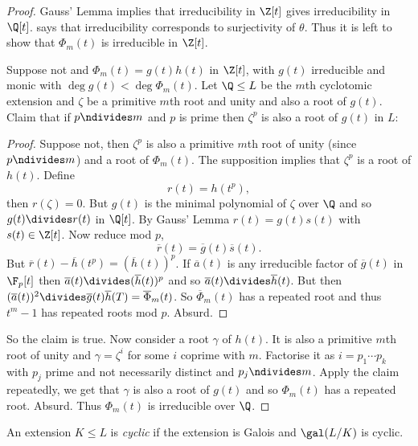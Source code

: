 \documentclass[a4paper]{article}
\newcommand*{\red}[1]{\overline{#1}}
\begin{document}
\begin{proof}
  Gauss' Lemma implies that irreducibility in \(\Z[t]\) gives irreducibility in \(\Q[t]\).  says that irreducibility corresponds to surjectivity of \(\theta\). Thus it is left to show that \(\Phi_m(t)\) is irreducible in \(\Z[t]\).

  Suppose not and \(\Phi_m(t) = g(t)h(t)\) in \(\Z[t]\), with \(g(t)\) irreducible and monic with \(\deg g(t) < \deg \Phi_m(t)\). Let \(\Q \leq L\) be the \(m\)th cyclotomic extension and \(\zeta\) be a primitive \(m\)th root and unity and also a root of \(g(t)\). Claim that if \(p \ndivides m\) and \(p\) is prime then \(\zeta^p\) is also a root of \(g(t)\) in \(L\):

  \begin{proof}
    Suppose not, then \(\zeta^p\) is also a primitive \(m\)th root of unity (since \(p \ndivides m\)) and a root of \(\Phi_m(t)\). The supposition implies that \(\zeta^p\) is a root of \(h(t)\). Define
    \[
      r(t) = h(t^p),
    \]
    then \(r(\zeta) = 0\). But \(g(t)\) is the minimal polynomial of \(\zeta\) over \(\Q\) and so \(g(t) \divides r(t)\) in \(\Q[t]\). By Gauss' Lemma \(r(t) = g(t)s(t)\) with \(s(t) \in \Z[t]\). Now reduce mod \(p\),
    \[
      \red r(t) = \red g(t) \red s(t).
    \]
    But \(\red r(t) - \red h(t^p) = (\red h(t))^p\). If \(\red a(t)\) is any irreducible factor of \(\red g(t)\) in \(\F_p[t]\) then \(\red a(t) \divides (\red h(t))^p\) and so \(\red a(t) \divides \red h(t)\). But then \((\red a(t))^2 \divides \red g(t) \red h(T) = \red \Phi_m(t)\). So \(\red \Phi_m(t)\) has a repeated root and thus \(t^m - 1\) has repeated roots mod \(p\). Absurd.
  \end{proof}
  
  So the claim is true. Now consider a root \(\gamma\) of \(h(t)\). It is also a primitive \(m\)th root of unity and \(\gamma = \zeta^i\) for some \(i\) coprime with \(m\). Factorise it as \(i = p_1 \cdots p_k\) with \(p_j\) prime and not necessarily distinct and \(p_j \ndivides m\). Apply the claim repeatedly, we get that \(\gamma\) is also a root of \(g(t)\) and so \(\Phi_m(t)\) has a repeated root. Absurd. Thus \(\Phi_m(t)\) is irreducible over \(\Q\).
\end{proof}

\begin{definition}
  An extension \(K \leq L\) is \emph{cyclic} if the extension is Galois and \(\gal(L/K)\) is cyclic.
\end{definition}
\end{document}
